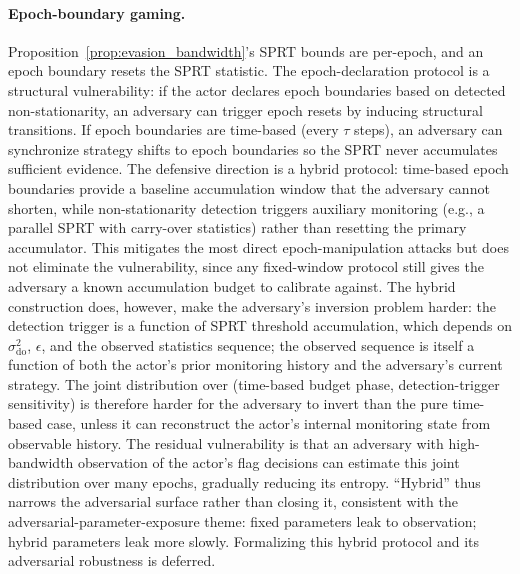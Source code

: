 \paragraph{Epoch-boundary gaming.}
Proposition~\ref{prop:evasion_bandwidth}'s SPRT bounds are
per-epoch, and an epoch boundary resets the SPRT statistic.
The epoch-declaration protocol is a structural vulnerability:
if the actor declares epoch boundaries based on detected
non-stationarity, an adversary can trigger epoch resets by inducing
structural transitions. If epoch boundaries are time-based (every
$\tau$ steps), an adversary can synchronize strategy shifts to epoch
boundaries so the SPRT never accumulates sufficient evidence.
The defensive direction is a hybrid protocol: time-based epoch
boundaries provide a baseline accumulation window that the adversary
cannot shorten, while non-stationarity detection triggers auxiliary
monitoring (e.g., a parallel SPRT with carry-over statistics) rather
than resetting the primary accumulator. This mitigates the most
direct epoch-manipulation attacks but does not eliminate the
vulnerability, since any fixed-window protocol still gives the
adversary a known accumulation budget to calibrate against.
The hybrid construction does, however, make the adversary's
inversion problem harder: the detection trigger is a function of
SPRT threshold accumulation, which depends on
$\sigma_{\mathrm{do}}^2$, $\epsilon$, and the observed statistics
sequence; the observed sequence is itself a function of both
the actor's prior monitoring history and the adversary's current
strategy. The joint distribution over (time-based budget phase,
detection-trigger sensitivity) is therefore harder for the adversary
to invert than the pure time-based case, unless it can reconstruct
the actor's internal monitoring state from observable history. The residual vulnerability is that an adversary with
high-bandwidth observation of the actor's flag decisions can
estimate this joint distribution over many epochs, gradually
reducing its entropy. ``Hybrid'' thus narrows the adversarial
surface rather than closing it, consistent with the
adversarial-parameter-exposure theme: fixed parameters leak to
observation; hybrid parameters leak more slowly.
Formalizing this hybrid protocol and its adversarial robustness
is deferred.

